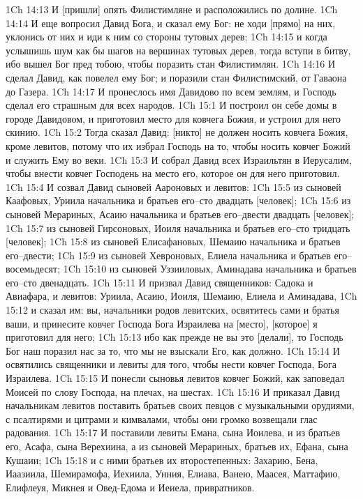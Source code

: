 1Ch 14:13  И [пришли] опять Филистимляне и расположились по долине.
1Ch 14:14  И еще вопросил Давид Бога, и сказал ему Бог: не ходи [прямо] на них, уклонись от них и иди к ним со стороны тутовых дерев;
1Ch 14:15  и когда услышишь шум как бы шагов на вершинах тутовых дерев, тогда вступи в битву, ибо вышел Бог пред тобою, чтобы поразить стан Филистимлян.
1Ch 14:16  И сделал Давид, как повелел ему Бог; и поразили стан Филистимский, от Гаваона до Газера.
1Ch 14:17  И пронеслось имя Давидово по всем землям, и Господь сделал его страшным для всех народов.
1Ch 15:1  И построил он себе домы в городе Давидовом, и приготовил место для ковчега Божия, и устроил для него скинию.
1Ch 15:2  Тогда сказал Давид: [никто] не должен носить ковчега Божия, кроме левитов, потому что их избрал Господь на то, чтобы носить ковчег Божий и служить Ему во веки.
1Ch 15:3  И собрал Давид всех Израильтян в Иерусалим, чтобы внести ковчег Господень на место его, которое он для него приготовил.
1Ch 15:4  И созвал Давид сыновей Аароновых и левитов:
1Ch 15:5  из сыновей Каафовых, Уриила начальника и братьев его--сто двадцать [человек];
1Ch 15:6  из сыновей Мерариных, Асаию начальника и братьев его--двести двадцать [человек];
1Ch 15:7  из сыновей Гирсоновых, Иоиля начальника и братьев его--сто тридцать [человек];
1Ch 15:8  из сыновей Елисафановых, Шемаию начальника и братьев его--двести;
1Ch 15:9  из сыновей Хевроновых, Елиела начальника и братьев его--восемьдесят;
1Ch 15:10  из сыновей Уззииловых, Аминадава начальника и братьев его--сто двенадцать.
1Ch 15:11  И призвал Давид священников: Садока и Авиафара, и левитов: Уриила, Асаию, Иоиля, Шемаию, Елиела и Аминадава,
1Ch 15:12  и сказал им: вы, начальники родов левитских, освятитесь сами и братья ваши, и принесите ковчег Господа Бога Израилева на [место], [которое] я приготовил для него;
1Ch 15:13  ибо как прежде не вы это [делали], то Господь Бог наш поразил нас за то, что мы не взыскали Его, как должно.
1Ch 15:14  И освятились священники и левиты для того, чтобы нести ковчег Господа, Бога Израилева.
1Ch 15:15  И понесли сыновья левитов ковчег Божий, как заповедал Моисей по слову Господа, на плечах, на шестах.
1Ch 15:16  И приказал Давид начальникам левитов поставить братьев своих певцов с музыкальными орудиями, с псалтирями и цитрами и кимвалами, чтобы они громко возвещали глас радования.
1Ch 15:17  И поставили левиты Емана, сына Иоилева, и из братьев его, Асафа, сына Верехиина, а из сыновей Мерариных, братьев их, Ефана, сына Кушаии;
1Ch 15:18  и с ними братьев их второстепенных: Захарию, Бена, Иаазиила, Шемирамофа, Иехиила, Унния, Елиава, Ванею, Маасея, Маттафию, Елифлеуя, Микнея и Овед-Едома и Иеиела, привратников.
